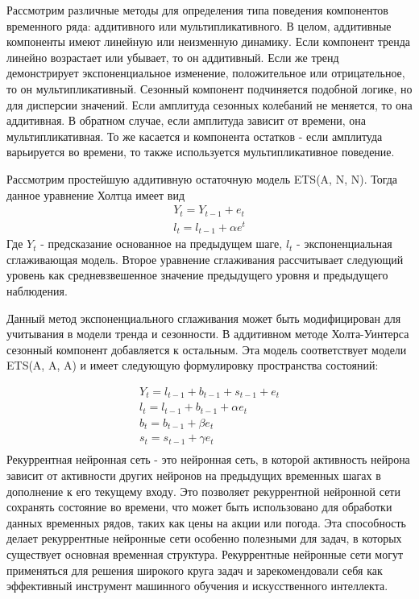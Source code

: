 \documentclass[12pt, a4paper]{article} %
\begin{document}
Рассмотрим различные методы для определения типа поведения компонентов временного ряда: аддитивного или мультипликативного. В целом, аддитивные компоненты имеют линейную или неизменную динамику. Если компонент тренда линейно возрастает или убывает, то он аддитивный. Если же тренд демонстрирует экспоненциальное изменение, положительное или отрицательное, то он мультипликативный. Сезонный компонент подчиняется подобной логике, но для дисперсии значений. Если амплитуда сезонных колебаний не меняется, то она аддитивная. В обратном случае, если амплитуда зависит от времени, она мультипликативная. То же касается и компонента остатков - если амплитуда варьируется во времени, то также используется мультипликативное поведение.


Рассмотрим простейшую аддитивную остаточную модель ETS(A, N, N). Тогда данное уравнение Холтца имеет вид
\begin{equation}
    \begin{aligned}
        Y_t = Y_{t-1}+e_t \\
        l_t = l_{t-1}+\alpha e^t
    \end{aligned}
\end{equation}
Где $Y_t$ - предсказание основанное на предыдущем шаге, $l_t$ - экспоненциальная сглаживающая модель. Второе уравнение сглаживания рассчитывает следующий уровень как средневзвешенное значение предыдущего уровня и предыдущего наблюдения.

Данный метод экспоненциального сглаживания может быть модифицирован для учитывания в модели тренда и сезонности. В аддитивном методе Холта-Уинтерса сезонный компонент добавляется к остальным. Эта модель соответствует модели ETS(A, A, A) и имеет следующую формулировку пространства состояний:


\begin{equation}
    \begin{aligned}
        Y_t = l_{t-1}+b_{t-1}+s_{t-1}+e_t \\
        l_t = l_{t-1}+b_{t-1}+ \alpha e_t \\
        b_t = b_{t-1}+ \beta e_t \\
        s_t = s_{t-1}+ \gamma e_t \\
    \end{aligned}
\end{equation}
Рекуррентная нейронная сеть - это нейронная сеть, в которой активность нейрона зависит от активности других нейронов на предыдущих временных шагах в дополнение к его текущему входу. Это позволяет рекуррентной нейронной сети сохранять состояние во времени, что может быть использовано для обработки данных временных рядов, таких как цены на акции или погода. Эта способность делает рекуррентные нейронные сети особенно полезными для задач, в которых существует основная временная структура. Рекуррентные нейронные сети могут применяться для решения широкого круга задач и зарекомендовали себя как эффективный инструмент машинного обучения и искусственного интеллекта.
\end{document}
